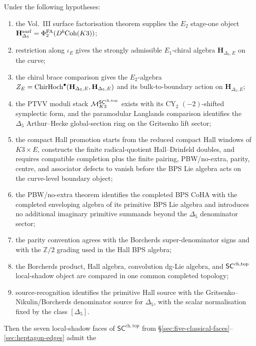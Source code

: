 \begin{theorem}
\label{thm:heptagon-K3-realisation}
\ClaimStatusConditional
Under the following hypotheses:
\begin{enumerate}[label=\textup{(\alph*)}]
\item the Vol.~III surface factorisation theorem supplies the
$E_2$ stage-one object $\mathbf H_{\Delta_5}^{\mathrm{surf}}
=\Phi^{\mathrm{FA}}_2(D^b\mathrm{Coh}(K3))$;
\item restriction along $\iota_E$ gives the strongly admissible
$E_1$-chiral algebra $\mathbf H_{\Delta_5,E}$ on the curve;
\item the chiral brace comparison gives the $E_2$-algebra
$Z_E=\mathrm{ChirHoch}^\bullet(\mathbf H_{\Delta_5,E},\mathbf H_{\Delta_5,E})$
and its bulk-to-boundary action on $\mathbf H_{\Delta_5,E}$;
\item the PTVV moduli stack
$\mathcal M^{\mathsf{SC}^{\mathrm{ch},\mathrm{top}}}_{K3}$ exists with its CY$_2$ $(-2)$-shifted
symplectic form, and the paramodular Langlands comparison identifies
the $\Delta_5$ Arthur--Hecke global-section ring on the Gritsenko
lift sector;
\item the compact Hall promotion starts from the reduced compact
Hall windows of \(K3\times E\), constructs the finite
radical-quotient Hall--Drinfeld doubles, and requires compatible
completion plus the finite pairing, PBW/no-extra, parity, centre, and
associator defects to vanish before the BPS Lie algebra acts on the
curve-level boundary object;
\item the PBW/no-extra theorem identifies the completed BPS CoHA with
the completed enveloping algebra of its primitive BPS Lie algebra and
introduces no additional imaginary primitive summands beyond the
$\Delta_5$ denominator sector;
\item the parity convention agrees with the Borcherds super-denominator
signs and with the $\mathbb Z/2$ grading used in the Hall BPS algebra;
\item the Borcherds product, Hall algebra, convolution dg-Lie algebra,
and $\mathsf{SC}^{\mathrm{ch},\mathrm{top}}$ local-shadow object are compared in one common completed
topology;
\item source-recognition identifies the primitive Hall source with the
Gritsenko--Nikulin/Borcherds denominator source for $\Delta_5$, with
the scalar normalisation fixed by the class $[\Delta_5]$.
\end{enumerate}
Then the seven local-shadow faces of
$\mathsf{SC}^{\mathrm{ch,top}}$ from
\S\ref{sec:five-classical-faces}--\ref{sec:heptagon-edges} admit the

\end{theorem}
